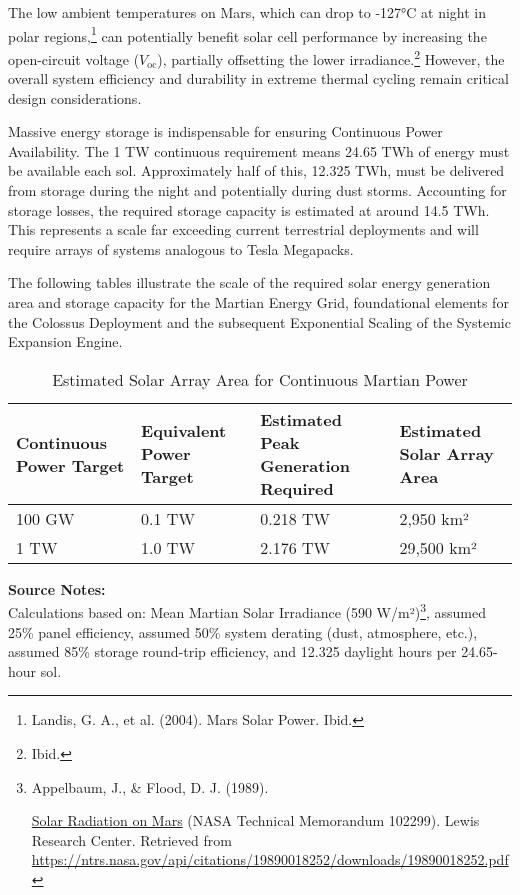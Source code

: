 \documentclass[fontsize=10pt, oneside, DIV=calc]{scrartcl}
\begin{document}
\medskip

\noindent
The low ambient temperatures on Mars, which can drop to -127°C at night in polar regions,\footnote{Landis, G. A., et al. (2004). Mars Solar Power. Ibid.} can potentially benefit solar cell performance by increasing the open-circuit voltage (\(V_{\text{oc}}\)), partially offsetting the lower irradiance.\footnote{Ibid.} However, the overall system efficiency and durability in extreme thermal cycling remain critical design considerations.

\medskip

\noindent
Massive energy storage is indispensable for ensuring Continuous Power Availability. The 1 TW continuous requirement means 24.65 TWh of energy must be available each sol. Approximately half of this, 12.325 TWh, must be delivered from storage during the night and potentially during dust storms. Accounting for storage losses, the required storage capacity is estimated at around 14.5 TWh. This represents a scale far exceeding current terrestrial deployments and will require arrays of systems analogous to Tesla Megapacks.

\medskip

\noindent
The following tables illustrate the scale of the required solar energy generation area and storage capacity for the Martian Energy Grid, foundational elements for the Colossus Deployment and the subsequent Exponential Scaling of the Systemic Expansion Engine.

\begin{table}[htbp]
\centering
\caption{Estimated Solar Array Area for Continuous Martian Power}
\begin{tabularx}{\textwidth}{|X|X|X|X|}
\hline
\textbf{Continuous Power Target} & \textbf{Equivalent Power Target} & \textbf{Estimated Peak Generation Required} & \textbf{Estimated Solar Array Area} \\ \hline
100 GW & 0.1 TW & 0.218 TW & 2,950 km² \\ \hline
1 TW & 1.0 TW & 2.176 TW & 29,500 km² \\ \hline
\end{tabularx}
\end{table}
\noindent\footnotesize
\textbf{Source Notes:}\\[0.5em]
Calculations based on: Mean Martian Solar Irradiance (590 W/m²)\footnote{Appelbaum, J., \& Flood, D. J. (1989). 







\href{https://ntrs.nasa.gov/api/citations/19890018252/downloads/19890018252.pdf}\url{Solar Radiation on Mars} (NASA Technical Memorandum 102299). Lewis Research Center. Retrieved from \url{https://ntrs.nasa.gov/api/citations/19890018252/downloads/19890018252.pdf}}, assumed 25\% panel efficiency, assumed 50\% system derating (dust, atmosphere, etc.), assumed 85\% storage round-trip efficiency, and 12.325 daylight hours per 24.65-hour sol.\\[1em]
\end{document}
